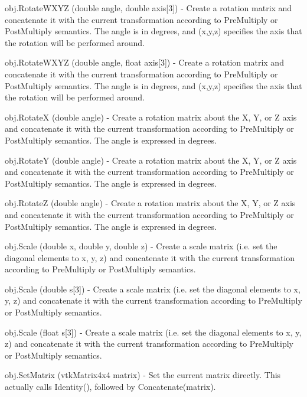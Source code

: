 \begin{DoxyItemize}
\item {\ttfamily obj.\-Rotate\-W\-X\-Y\-Z (double angle, double axis\mbox{[}3\mbox{]})} -\/ Create a rotation matrix and concatenate it with the current transformation according to Pre\-Multiply or Post\-Multiply semantics. The angle is in degrees, and (x,y,z) specifies the axis that the rotation will be performed around.  
\item {\ttfamily obj.\-Rotate\-W\-X\-Y\-Z (double angle, float axis\mbox{[}3\mbox{]})} -\/ Create a rotation matrix and concatenate it with the current transformation according to Pre\-Multiply or Post\-Multiply semantics. The angle is in degrees, and (x,y,z) specifies the axis that the rotation will be performed around.  
\item {\ttfamily obj.\-Rotate\-X (double angle)} -\/ Create a rotation matrix about the X, Y, or Z axis and concatenate it with the current transformation according to Pre\-Multiply or Post\-Multiply semantics. The angle is expressed in degrees.  
\item {\ttfamily obj.\-Rotate\-Y (double angle)} -\/ Create a rotation matrix about the X, Y, or Z axis and concatenate it with the current transformation according to Pre\-Multiply or Post\-Multiply semantics. The angle is expressed in degrees.  
\item {\ttfamily obj.\-Rotate\-Z (double angle)} -\/ Create a rotation matrix about the X, Y, or Z axis and concatenate it with the current transformation according to Pre\-Multiply or Post\-Multiply semantics. The angle is expressed in degrees.  
\item {\ttfamily obj.\-Scale (double x, double y, double z)} -\/ Create a scale matrix (i.\-e. set the diagonal elements to x, y, z) and concatenate it with the current transformation according to Pre\-Multiply or Post\-Multiply semantics.  
\item {\ttfamily obj.\-Scale (double s\mbox{[}3\mbox{]})} -\/ Create a scale matrix (i.\-e. set the diagonal elements to x, y, z) and concatenate it with the current transformation according to Pre\-Multiply or Post\-Multiply semantics.  
\item {\ttfamily obj.\-Scale (float s\mbox{[}3\mbox{]})} -\/ Create a scale matrix (i.\-e. set the diagonal elements to x, y, z) and concatenate it with the current transformation according to Pre\-Multiply or Post\-Multiply semantics.  
\item {\ttfamily obj.\-Set\-Matrix (vtk\-Matrix4x4 matrix)} -\/ Set the current matrix directly. This actually calls Identity(), followed by Concatenate(matrix).  

\end{DoxyItemize}
